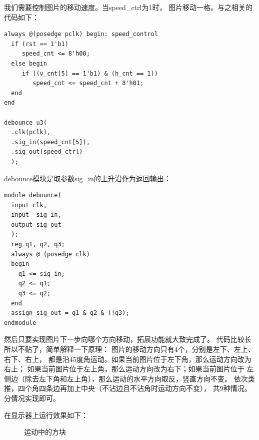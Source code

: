 \documentclass[12pt,a4paper,UTF8]{article}
\begin{document}
我们需要控制图片的移动速度。当\mbox{speed\_ctrl}为1时，
图片移动一格。与之相关的代码如下：
\begin{lstlisting}[style=verilog-style]  
always @(posedge pclk) begin: speed_control
  if (rst == 1'b1)
     speed_cnt <= 8'h00;
  else begin
     if ((v_cnt[5] == 1'b1) & (h_cnt == 1))
        speed_cnt <= speed_cnt + 8'h01;
  end
end

debounce u3(
  .clk(pclk), 
  .sig_in(speed_cnt[5]),
  .sig_out(speed_ctrl)
  );
\end{lstlisting}

debounce模块是取参数\mbox{sig\_in}的上升沿作为返回输出：
\begin{lstlisting}[style=verilog-style]
module debounce(
  input clk,
  input  sig_in,
  output sig_out
  );
  reg q1, q2, q3;
  always @ (posedge clk)
  begin
    q1 <= sig_in;
    q2 <= q1;
    q3 <= q2;
  end
  assign sig_out = q1 & q2 & (!q3);
endmodule
\end{lstlisting}

然后只要实现图片下一步向哪个方向移动，拓展功能就大致完成了。
代码比较长所以不贴了，简单解释一下原理：
图片的移动方向只有4个，分别是左下、左上、右下、右上，
都是沿45度角运动。如果当前图片位于左下角，那么运动方向改为右上；
如果当前图片位于左上角，那么运动方向改为右下；如果当前图片位于
左侧边（除去左下角和左上角），那么运动的水平方向取反，竖直方向不变。
依次类推，四个角四条边再加上中央（不沾边且不沾角时运动方向不变），
共9种情况。分情况实现即可。

在显示器上运行效果如下：
\begin{figure}[H]
  \centering
  \caption{运动中的方块}
  \label{img3}
\end{figure}
\end{document}

